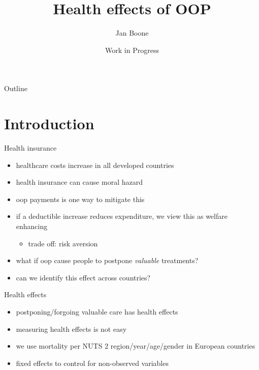 \documentclass[presentation]{beamer}
\author{Jan Boone}
\date{Work in Progress}
\title{Health effects of OOP}
\begin{document}
\maketitle
\begin{frame}{Outline}
\setcounter{tocdepth}{1}
\tableofcontents
\end{frame}




\section*{Introduction}
\label{sec:orgafef9d2}

\begin{frame}[label={sec:orgfc622fb}]{Health insurance}
\begin{itemize}
\item healthcare costs increase in all developed countries
\item health insurance can cause moral hazard
\item oop payments is one way to mitigate this
\item if a deductible increase reduces expenditure, we view this as welfare enhancing
\begin{itemize}
\item trade off: risk aversion
\end{itemize}
\item what if oop cause people to postpone \emph{valuable} treatments?
\item can we identify this effect across countries?
\end{itemize}
\end{frame}

\begin{frame}[label={sec:org8bc88cc}]{Health effects}
\begin{itemize}
\item postponing/forgoing valuable care has health effects
\item measuring health effects is not easy
\item we use mortality per NUTS 2 region/year/age/gender in European countries
\item fixed effects to control for non-observed variables
\end{itemize}
\end{frame}
\end{document}
